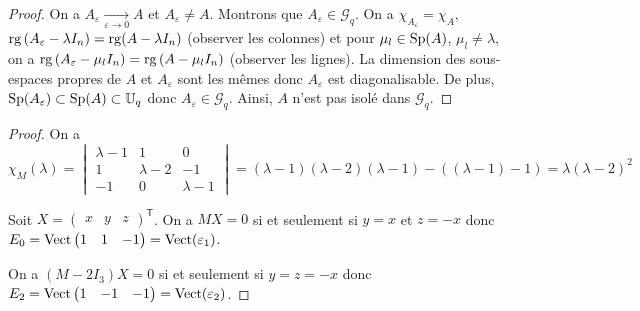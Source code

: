 \documentclass[12pt]{article}
\begin{document}
\begin{proof}
	On a $A_{\varepsilon}\xrightarrow[\varepsilon\to0]{}A$ et $A_{\varepsilon}\neq A$. Montrons que $A_{\varepsilon}\in \mathcal{G}_{q}$. On a $\chi_{A_{\varepsilon}}=\chi_{A}$, $\operatorname{rg}\left(A_{\varepsilon}-\lambda I_{n}\right)=\operatorname{rg}(A-\lambda I_{n})$ (observer les colonnes) et pour $\mu_{l}\in\operatorname{Sp}(A)$, $\mu_{l}\neq \lambda$, on a $\operatorname{rg}\left(A_{\varepsilon}-\mu_{l}I_{n}\right)=\operatorname{rg}\left(A-\mu_{l}I_{n}\right)$ (observer les lignes). La dimension des sous-espaces propres de $A$ et $A_{\varepsilon}$ sont les mêmes donc $A_{\varepsilon}$ est diagonalisable. De plus, $\operatorname{Sp}(A_{\varepsilon})\subset\operatorname{Sp}(A)\subset\mathbb{U}_{q}$ donc $A_{\varepsilon}\in\mathcal{G}_{q}$. Ainsi, $A$ n'est pas isolé dans $\mathcal{G}_{q}$.
\end{proof}

\begin{proof}
	On a 
	\begin{equation}
		\chi_{M}(\lambda)=
		\begin{vmatrix}
			\lambda-1 &1&0\\
			1&\lambda-2&-1\\
			-1&0&\lambda-1
		\end{vmatrix}=(\lambda-1)(\lambda-2)(\lambda-1)-\left((\lambda-1)-1\right)=\lambda(\lambda-2)^{2}
	\end{equation}

	Soit $X=\begin{pmatrix}
		x&y&z
	\end{pmatrix}^{\mathsf{T}}$. On a $MX=0$ si et seulement si $y=x$ et $z=-x$ donc $E_{0}=\operatorname{Vect}\begin{pmatrix}
		1&1&-1
	\end{pmatrix}=\operatorname{Vect}(\varepsilon_{1})$.

	On a $(M-2I_{3})X=0$ si et seulement si $y=z=-x$ donc $E_{2}=\operatorname{Vect}\begin{pmatrix}
		1&-1&-1
	\end{pmatrix}=\operatorname{Vect}(\varepsilon_{2})$.


\end{proof}
\end{document}
